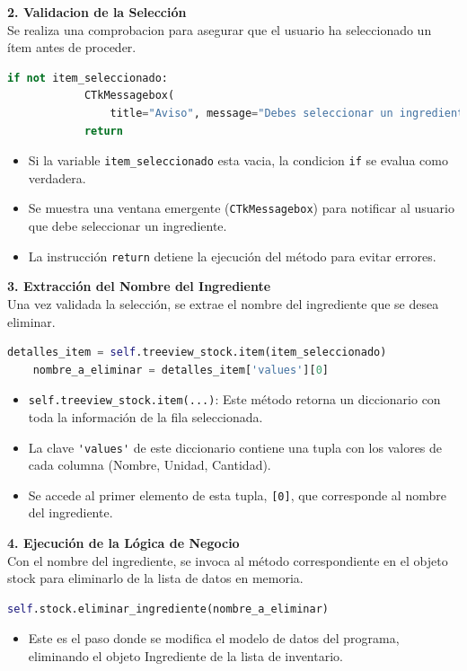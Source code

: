 \documentclass[a4paper,12pt]{article}
\begin{document}
\textbf{2. Validacion de la Selección}\\
Se realiza una comprobacion para asegurar que el usuario ha seleccionado un ítem antes de proceder.
\begin{lstlisting}[language=Python, caption={desenglosando codigo}, frame=single]
    if not item_seleccionado:
            CTkMessagebox(
                title="Aviso", message="Debes seleccionar un ingrediente de la tabla.", icon="warning")
            return
\end{lstlisting}
\begin{itemize} 
\item Si la variable \verb|item_seleccionado| esta vacia, la condicion \verb|if| se evalua como verdadera. 
\item Se muestra una ventana emergente (\verb|CTkMessagebox|) para notificar al usuario que debe seleccionar un ingrediente. 
\item La instrucción \verb|return| detiene la ejecución del método para evitar errores. 
\end{itemize}
\textbf{3. Extracción del Nombre del Ingrediente}\\
Una vez validada la selección, se extrae el nombre del ingrediente que se desea eliminar.
\begin{lstlisting}[language=Python, caption={desenglosando codigo}, frame=single]
    detalles_item = self.treeview_stock.item(item_seleccionado)
    nombre_a_eliminar = detalles_item['values'][0]
\end{lstlisting}
\begin{itemize} 
\item \verb|self.treeview_stock.item(...)|: Este método retorna un diccionario con toda la información de la fila seleccionada. 
\item La clave \verb|'values'| de este diccionario contiene una tupla con los valores de cada columna (Nombre, Unidad, Cantidad). 
\item Se accede al primer elemento de esta tupla, \verb|[0]|, que corresponde al nombre del ingrediente. 
\end{itemize}
\newpage

\textbf{4. Ejecución de la Lógica de Negocio}\\
Con el nombre del ingrediente, se invoca al método correspondiente en el objeto stock para eliminarlo de la lista de datos en memoria.
\begin{lstlisting}[language=Python, caption={desenglosando codigo}, frame=single]
    self.stock.eliminar_ingrediente(nombre_a_eliminar)
\end{lstlisting}
\begin{itemize} 
\item Este es el paso donde se modifica el modelo de datos del programa, eliminando el objeto Ingrediente de la lista de inventario. 
\end{itemize}
\end{document}
